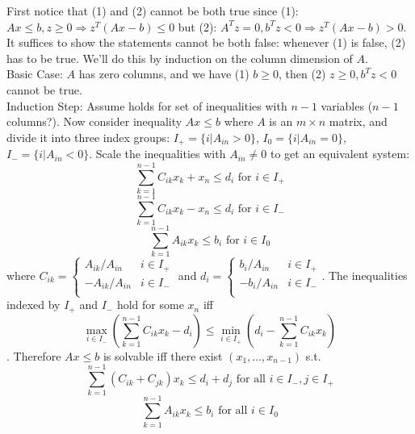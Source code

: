 \documentclass[10pt]{article}
\def\imp{\Rightarrow}
\theoremstyle{definition}
\begin{document}
\proof First notice that (1) and (2) cannot be both true since (1): $Ax \le b, z\ge 0 \imp z^T(Ax - b) \le 0$
but (2): $A^Tz = 0, b^Tz < 0 \imp z^T(Ax - b) > 0$. It suffices to show the statements cannot be both false:
whenever (1) is false, (2) has to be true. We'll do this by induction on the column dimension of $A$.\\
Basic Case: $A$ has zero columns, and we have (1) $b \ge 0$, then (2) $z \ge 0, b^Tz < 0$ cannot be true.\\
Induction Step: Assume holds for set of inequalities with $n-1$ variables ($n-1$ columns?).
Now consider inequality $Ax \le b$ where $A$ is an $m \times n$ matrix, and divide it into three index groups:
$I_{+} = \{i | A_{in} > 0\}$, $I_{0} = \{i | A_{in} = 0\}$, $I_{-} = \{i | A_{in} < 0\}$.
Scale the inequalities with $A_{in} \neq 0$ to get an equivalent system:
\begin{equation*}
	\sum_{k=1}^{n-1}C_{ik}x_{k} + x_{n} \le d_{i} \text{ for } i \in I_{+}
\end{equation*}
\begin{equation*}
	\sum_{k=1}^{n-1}C_{ik}x_{k} - x_{n} \le d_{i} \text{ for } i \in I_{-}
\end{equation*}
\begin{equation*}
	\sum_{k=1}^{n-1}A_{ik}x_{k} \le b_{i} \text{ for } i \in I_{0}
\end{equation*}
where 
$C_{ik} = \begin{cases}
	A_{ik}/A_{in} & i \in I_{+} \\
	-A_{ik}/A_{in} & i \in I_{-} \\
\end{cases}$ and 
$d_{i} = \begin{cases}
	b_{i}/A_{in} & i \in I_{+} \\
	-b_{i}/A_{in} & i \in I_{-} \\
\end{cases}$. The inequalities indexed by $I_{+}$ and $I_{−}$ hold for some $x_{n}$ iff 
\begin{equation*}
	\max_{i\in I_{-}}(\sum_{k=1}^{n-1}C_{ik}x_{k} - d_{i}) \le \min_{i\in I_{+}}(d_{i} - \sum_{k=1}^{n-1}C_{ik}x_{k})
\end{equation*}. Therefore $Ax \le b$ is solvable iff there exist $(x_{1}, \dots, x_{n-1})$ s.t.
\begin{equation*}
	\sum_{k=1}^{n-1}(C_{ik}+C_{jk})x_{k} \le d_{i} + d_{j} \text{ for all } i \in I_{-}, j \in I_{+}
\end{equation*}
\begin{equation*}
	\sum_{k=1}^{n-1}A_{ik}x_{k} \le b_{i} \text{ for all } i \in I_{0}
\end{equation*}
\end{document}
